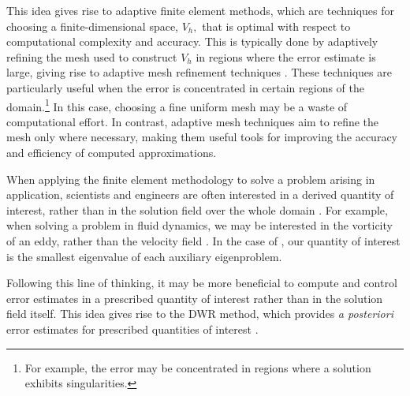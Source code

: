

This idea gives rise to adaptive finite element methods, which are techniques for choosing a finite-dimensional space, $V_h,$ that is optimal with respect to computational complexity and accuracy. This is typically done by adaptively refining the mesh used to construct $V_h$ in regions where the error estimate is large, giving rise to adaptive mesh refinement techniques \cite[Section~8.6]{Scott}.
These techniques are particularly useful when the error is concentrated in certain regions of the domain.\footnote{For example, the error may be concentrated in regions where a solution exhibits singularities.} In this case, choosing a fine uniform mesh may be a waste of computational effort. In contrast, adaptive mesh techniques aim to refine the mesh only where necessary, making them useful tools for improving the accuracy and efficiency of computed approximations.



When applying the finite element methodology to solve a problem arising in application, scientists and engineers are often interested in a derived quantity of interest, rather than in the solution field over the whole domain \cite{Giles97, Becker, ActaGiles}. 
For example, when solving a problem in fluid dynamics, we may be interested in the vorticity of an eddy, rather than the velocity field \cite[Section~8.6]{Scott}. In the case of , our quantity of interest is the smallest eigenvalue of each auxiliary eigenproblem.

Following this line of thinking, it may be more beneficial to compute and control error estimates in a prescribed quantity of interest rather than in the solution field itself. This idea gives rise to the DWR method, which provides \textit{a posteriori} error estimates for prescribed quantities of interest \cite{Becker, Bangerth}.


